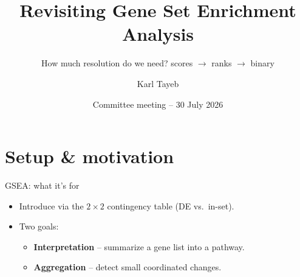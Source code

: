 \documentclass[aspectratio=169]{beamer}
\title{Revisiting Gene Set Enrichment Analysis}
\subtitle{How much resolution do we need? scores $\to$ ranks $\to$ binary}
\author{Karl Tayeb}
\date{Committee meeting -- 30 July 2026}
\begin{document}
\begin{frame}[plain]
  \titlepage
\end{frame}

\section{Setup \& motivation}

\begin{frame}{GSEA: what it's for}
  \begin{itemize}
    \item Introduce via the $2\times 2$ contingency table (DE vs.\ in-set).
    \item Two goals:
      \begin{itemize}
        \item \textbf{Interpretation} -- summarize a gene list into a pathway.
        \item \textbf{Aggregation} -- detect small coordinated changes.
      \end{itemize}
  \end{itemize}
\end{frame}
\end{document}
